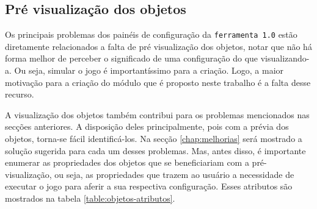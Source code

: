 \documentclass[12pt,oneside,openright,a4paper,english,brazil,sumario=tradicional]{abntex2}
\begin{document}
\subsection{Pré visualização dos objetos}
\label{sec:previa-objetos}
Os principais problemas dos painéis de configuração da \texttt{ferramenta 1.0} estão diretamente relacionados a falta de pré visualização dos objetos, notar que não há forma melhor de perceber o significado de uma configuração do que visualizando-a. Ou seja, simular o jogo é importantíssimo para a criação. Logo, a maior motivação para a criação do módulo que é proposto neste trabalho é a falta desse recurso.

A visualização dos objetos também contribui para os problemas mencionados nas secções anteriores. A disposição deles principalmente, pois com a prévia dos objetos, torna-se fácil identificá-los. Na secção \ref{chap:melhorias} será mostrado a solução sugerida para cada um desses problemas. Mas, antes disso, é importante enumerar as propriedades dos objetos que se beneficiariam com a pré-visualização, ou seja, as propriedades que trazem ao usuário a necessidade de executar o jogo para aferir a sua respectiva configuração. Esses atributos são mostrados na tabela \ref{table:objetos-atributos}.
\end{document}
